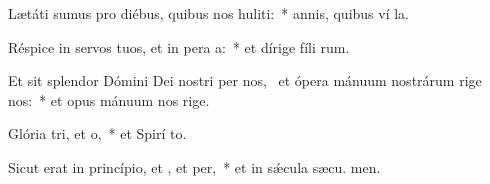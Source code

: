 \item Lætáti sumus pro diébus, quibus nos huliti:~* annis, quibus ví la.
\item Réspice in servos tuos, et in pera a:~* et dírige fíli rum.
\item Et sit splendor Dómini Dei nostri per nos,~\pscross{} et ópera mánuum nostrárum rige  nos:~* et opus mánuum nos rige.
\item Glória tri, et o,~* et Spirí to.
\item Sicut erat in princípio, et , et per,~* et in sǽcula sæcu. men.
